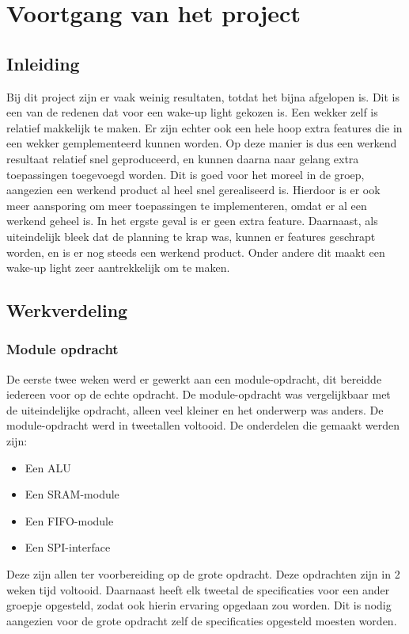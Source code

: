 \chapter{Voortgang van het project}

\section{Inleiding}
Bij dit project zijn er vaak weinig resultaten, totdat het bijna afgelopen is. 
Dit is een van de redenen dat voor een wake-up light gekozen is.
Een wekker zelf is relatief makkelijk te maken. 
Er zijn echter ook een hele hoop extra features die in een wekker gemplementeerd kunnen worden. 
Op deze manier is dus een werkend resultaat relatief snel geproduceerd, en kunnen daarna naar gelang extra toepassingen toegevoegd worden. 
Dit is goed voor het moreel in de groep, aangezien een werkend product al heel snel gerealiseerd is.
Hierdoor is er ook meer aansporing om meer toepassingen te implementeren, omdat er al een werkend geheel is. 
In het ergste geval is er geen extra feature.
Daarnaast, als uiteindelijk bleek dat de planning te krap was, kunnen er features geschrapt worden, en is er nog steeds een werkend product. 
Onder andere dit maakt een wake-up light zeer aantrekkelijk om te maken.

\section{Werkverdeling}
\subsection{Module opdracht}
De eerste twee weken werd er gewerkt aan een module-opdracht, dit bereidde iedereen voor op de echte opdracht. 
De module-opdracht was vergelijkbaar met de uiteindelijke opdracht, alleen veel kleiner en het onderwerp was anders.
De module-opdracht werd in tweetallen voltooid. De onderdelen die gemaakt werden zijn:
\begin{itemize}[nolistsep]
	\item Een ALU
	\item Een SRAM-module
	\item Een FIFO-module
	\item Een SPI-interface
\end{itemize}
Deze zijn allen ter voorbereiding op de grote opdracht. Deze opdrachten zijn in 2 weken tijd voltooid. 
Daarnaast heeft elk tweetal de specificaties voor een ander groepje opgesteld, zodat ook hierin ervaring opgedaan zou worden.
Dit is nodig aangezien voor de grote opdracht zelf de specificaties opgesteld moesten worden. 

